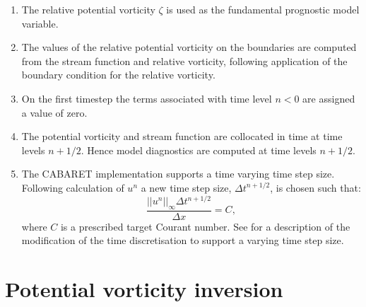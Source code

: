 \documentclass[a4paper]{book}
\begin{document}
\begin{enumerate}
  \item The relative potential vorticity $\zeta$ is used as the fundamental
        prognostic model variable.
  \item The values of the relative potential vorticity on the boundaries are
        computed from the stream function and relative vorticity, following
        application of the boundary condition for the relative vorticity.
  \item On the first timestep the terms associated with time level $n < 0$ are
        assigned a value of zero.
  \item The potential vorticity and stream function are collocated in time
        at time levels $n + 1 / 2$. Hence model diagnostics are computed
        at time levels $n + 1 / 2$.
  \item The CABARET implementation supports a time varying time step size. Following
        calculation of $u^n$ a new time step size, $\Delta t^{n + 1 / 2}$, is chosen
        such that:
        \begin{equation*}
          \frac{\left| \left| u^n \right| \right|_\infty \Delta t^{n + 1 / 2}}{\Delta x} = C,
        \end{equation*}
        where $C$ is
        a prescribed target Courant number. See \citet{karabasov2009} for a
        description of the modification of the time discretisation to support a
        varying time step size.
\end{enumerate}

\section{Potential vorticity inversion}\label{sect:pv_inversion}
\end{document}
